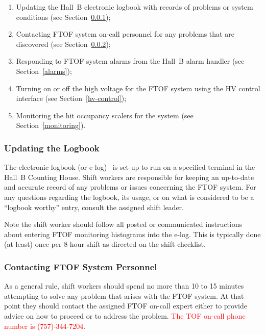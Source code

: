 \documentclass[12pt]{article}
\begin{document}
\begin{enumerate}
\item Updating the Hall~B electronic logbook with records of problems or system 
conditions (see Section~\ref{logbook});

\item Contacting FTOF system on-call personnel for any problems that are discovered 
(see Section~\ref{contact});

\item Responding to FTOF system alarms from the Hall~B alarm handler (see 
Section~\ref{alarms});

\item Turning on or off the high voltage for the FTOF system using the HV control 
interface (see Section~\ref{hv-control});

\item Monitoring the hit occupancy scalers for the system (see Section~\ref{monitoring}).
\end{enumerate}

\subsubsection{Updating the Logbook}
\label{logbook}

The electronic logbook (or e-log)~\cite{e-log} is set up to run on a specified terminal 
in the Hall~B Counting House. Shift workers are responsible for keeping an up-to-date 
and accurate record of any problems or issues concerning the FTOF system. For any 
questions regarding the logbook, its usage, or on what is considered to be a ``logbook 
worthy'' entry, consult the assigned shift leader.

Note the shift worker should follow all posted or communicated instructions about entering 
FTOF monitoring histograms into the e-log. This is typically done (at least) once per 8-hour 
shift as directed on the shift checklist.

\subsubsection{Contacting FTOF System Personnel}
\label{contact}

As a general rule, shift workers should spend no more than 10 to 15 minutes attempting to 
solve any problem that arises with the FTOF system. At that point they should contact the 
assigned FTOF on-call expert either to provide advice on how to proceed or to address the 
problem. \textcolor{red}{The TOF on-call phone number is (757)-344-7204.}
\end{document}

